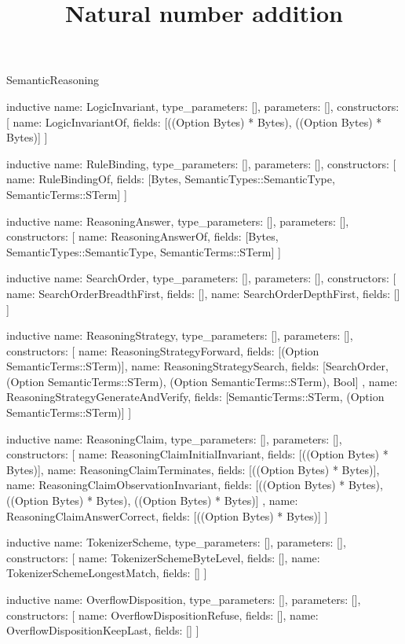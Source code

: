 \begin{lexlean}{SemanticReasoning}
\title{Natural number addition}
\begin{semanticmodule}
inductive{
  name: LogicInvariant,
  type_parameters: [],
  parameters: [],
  constructors: [
    {name: LogicInvariantOf, fields: [((Option Bytes) * Bytes), ((Option Bytes) * Bytes)]}
  ]
}

inductive{
  name: RuleBinding,
  type_parameters: [],
  parameters: [],
  constructors: [
    {name: RuleBindingOf, fields: [Bytes, SemanticTypes::SemanticType, SemanticTerms::STerm]}
  ]
}

inductive{
  name: ReasoningAnswer,
  type_parameters: [],
  parameters: [],
  constructors: [
    {name: ReasoningAnswerOf, fields: [Bytes, SemanticTypes::SemanticType, SemanticTerms::STerm]}
  ]
}

inductive{
  name: SearchOrder,
  type_parameters: [],
  parameters: [],
  constructors: [
    {name: SearchOrderBreadthFirst, fields: []},
    {name: SearchOrderDepthFirst, fields: []}
  ]
}

inductive{
  name: ReasoningStrategy,
  type_parameters: [],
  parameters: [],
  constructors: [
    {name: ReasoningStrategyForward, fields: [(Option SemanticTerms::STerm)]},
    {
      name: ReasoningStrategySearch,
      fields: [SearchOrder, (Option SemanticTerms::STerm), (Option SemanticTerms::STerm), Bool]
    },
    {
      name: ReasoningStrategyGenerateAndVerify,
      fields: [SemanticTerms::STerm, (Option SemanticTerms::STerm)]
    }
  ]
}

inductive{
  name: ReasoningClaim,
  type_parameters: [],
  parameters: [],
  constructors: [
    {name: ReasoningClaimInitialInvariant, fields: [((Option Bytes) * Bytes)]},
    {name: ReasoningClaimTerminates, fields: [((Option Bytes) * Bytes)]},
    {
      name: ReasoningClaimObservationInvariant,
      fields: [((Option Bytes) * Bytes), ((Option Bytes) * Bytes), ((Option Bytes) * Bytes)]
    },
    {name: ReasoningClaimAnswerCorrect, fields: [((Option Bytes) * Bytes)]}
  ]
}

inductive{
  name: TokenizerScheme,
  type_parameters: [],
  parameters: [],
  constructors: [
    {name: TokenizerSchemeByteLevel, fields: []},
    {name: TokenizerSchemeLongestMatch, fields: []}
  ]
}

inductive{
  name: OverflowDisposition,
  type_parameters: [],
  parameters: [],
  constructors: [
    {name: OverflowDispositionRefuse, fields: []},
    {name: OverflowDispositionKeepLast, fields: []}
  ]
}


\end{semanticmodule}
\end{lexlean}
